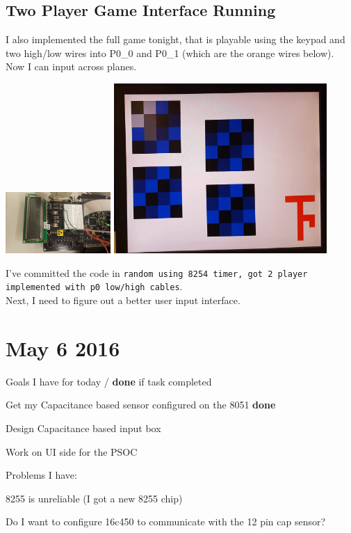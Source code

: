 \documentclass[12pt,twoside]{article}
\newenvironment{tight_itemize}{
\begin{itemize}
  \setlength{\itemsep}{0pt}
  \setlength{\parskip}{0pt}
}{\end{itemize}}
\begin{document}
\subsection{Two Player Game Interface Running}
I also implemented the full game tonight, that is playable using the keypad and two high/low wires into P0\_0 and P0\_1 (which are the orange wires below). Now I can input across planes. 
\begin{center}
\includegraphics[width = 40mm]{Pics/5-4c.jpg}
\includegraphics[width = 81mm]{Pics/5-4a.jpg}
\end{center}
I've committed the code in \texttt{random using 8254 timer, got 2 player implemented with p0 low/high cables}. 
\\ Next, I need to figure out a better user input interface. 


\newpage
\section{May 6 2016}

Goals I have for today / {\bf done} if task completed
\begin{tight_itemize}
\item Get my Capacitance based sensor configured on the 8051 {\bf done}
\item Design Capacitance based input box %
\item Work on UI side for the PSOC 
\end{tight_itemize}

Problems I have:
\begin{tight_itemize}
\item 8255 is unreliable (I got a new 8255 chip)
\item Do I want to configure 16c450 to communicate with the 12 pin cap sensor?
\end{tight_itemize}
\end{document}
